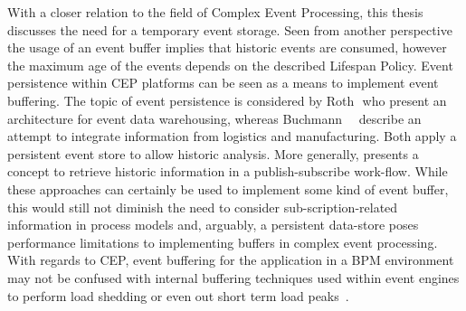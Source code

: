 

With a closer relation to the field of Complex Event Processing, this thesis discusses the need for a temporary event storage. 
Seen from another perspective the usage of an event buffer implies that historic events are consumed, however the maximum age of the events depends on the described Lifespan Policy.
Event persistence within CEP platforms can be seen as a means to implement event buffering.
The topic of event persistence is considered by Roth\,\etal\,\cite{roth2010event} who present an architecture for event data warehousing, whereas Buchmann~\etal~\cite{buchmann2010event} describe an attempt to integrate information from logistics and manufacturing. 
Both apply a persistent event store to allow historic analysis.
More generally, \cite{li2007historic} presents a concept to retrieve historic information in a publish-subscribe work-flow.
While these approaches can certainly be used to implement some kind of event buffer, this would still not diminish the need to consider sub-scription-related information in process models and, arguably, a persistent data-store poses performance limitations to implementing buffers in complex event processing.
With regards to CEP, event buffering for the application in a BPM environment may not be confused with internal buffering techniques used within event engines to perform load shedding or even out short term load peaks~\cite{chakravarthy2009stream}.

